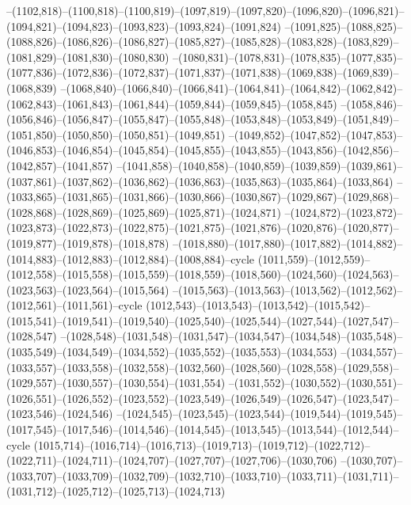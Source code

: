 --(1102,818)--(1100,818)--(1100,819)--(1097,819)--(1097,820)--(1096,820)--(1096,821)--(1094,821)--(1094,823)--(1093,823)--(1093,824)--(1091,824)
--(1091,825)--(1088,825)--(1088,826)--(1086,826)--(1086,827)--(1085,827)--(1085,828)--(1083,828)--(1083,829)--(1081,829)--(1081,830)--(1080,830)
--(1080,831)--(1078,831)--(1078,835)--(1077,835)--(1077,836)--(1072,836)--(1072,837)--(1071,837)--(1071,838)--(1069,838)--(1069,839)--(1068,839)
--(1068,840)--(1066,840)--(1066,841)--(1064,841)--(1064,842)--(1062,842)--(1062,843)--(1061,843)--(1061,844)--(1059,844)--(1059,845)--(1058,845)
--(1058,846)--(1056,846)--(1056,847)--(1055,847)--(1055,848)--(1053,848)--(1053,849)--(1051,849)--(1051,850)--(1050,850)--(1050,851)--(1049,851)
--(1049,852)--(1047,852)--(1047,853)--(1046,853)--(1046,854)--(1045,854)--(1045,855)--(1043,855)--(1043,856)--(1042,856)--(1042,857)--(1041,857)
--(1041,858)--(1040,858)--(1040,859)--(1039,859)--(1039,861)--(1037,861)--(1037,862)--(1036,862)--(1036,863)--(1035,863)--(1035,864)--(1033,864)
--(1033,865)--(1031,865)--(1031,866)--(1030,866)--(1030,867)--(1029,867)--(1029,868)--(1028,868)--(1028,869)--(1025,869)--(1025,871)--(1024,871)
--(1024,872)--(1023,872)--(1023,873)--(1022,873)--(1022,875)--(1021,875)--(1021,876)--(1020,876)--(1020,877)--(1019,877)--(1019,878)--(1018,878)
--(1018,880)--(1017,880)--(1017,882)--(1014,882)--(1014,883)--(1012,883)--(1012,884)--(1008,884)--cycle
(1011,559)--(1012,559)--(1012,558)--(1015,558)--(1015,559)--(1018,559)--(1018,560)--(1024,560)--(1024,563)--(1023,563)--(1023,564)--(1015,564)
--(1015,563)--(1013,563)--(1013,562)--(1012,562)--(1012,561)--(1011,561)--cycle
(1012,543)--(1013,543)--(1013,542)--(1015,542)--(1015,541)--(1019,541)--(1019,540)--(1025,540)--(1025,544)--(1027,544)--(1027,547)--(1028,547)
--(1028,548)--(1031,548)--(1031,547)--(1034,547)--(1034,548)--(1035,548)--(1035,549)--(1034,549)--(1034,552)--(1035,552)--(1035,553)--(1034,553)
--(1034,557)--(1033,557)--(1033,558)--(1032,558)--(1032,560)--(1028,560)--(1028,558)--(1029,558)--(1029,557)--(1030,557)--(1030,554)--(1031,554)
--(1031,552)--(1030,552)--(1030,551)--(1026,551)--(1026,552)--(1023,552)--(1023,549)--(1026,549)--(1026,547)--(1023,547)--(1023,546)--(1024,546)
--(1024,545)--(1023,545)--(1023,544)--(1019,544)--(1019,545)--(1017,545)--(1017,546)--(1014,546)--(1014,545)--(1013,545)--(1013,544)--(1012,544)--cycle
(1015,714)--(1016,714)--(1016,713)--(1019,713)--(1019,712)--(1022,712)--(1022,711)--(1024,711)--(1024,707)--(1027,707)--(1027,706)--(1030,706)
--(1030,707)--(1033,707)--(1033,709)--(1032,709)--(1032,710)--(1033,710)--(1033,711)--(1031,711)--(1031,712)--(1025,712)--(1025,713)--(1024,713)
